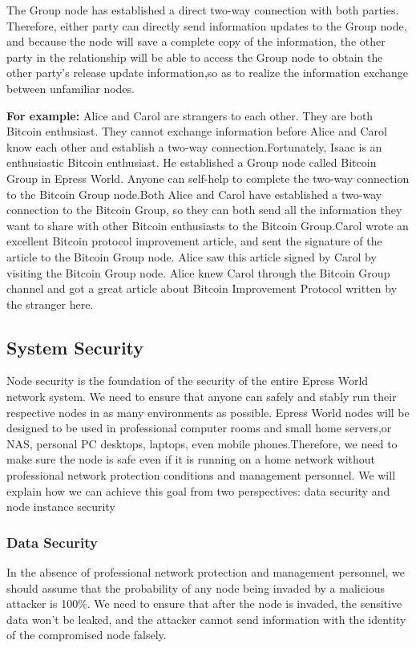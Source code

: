 \documentclass{article}
\begin{document}
    The Group node has established a direct two-way connection with both parties. Therefore, either party can directly send information updates to the Group node, and because the node will save a complete copy of the information, the other party in the relationship will be able to access the Group node to obtain the other party's release update information,so as to realize the information exchange between unfamiliar nodes.
    \newline
    \begin{blockqt}
    \textbf{For example: }Alice and Carol are strangers to each other. They are both Bitcoin enthusiast. They cannot exchange information before Alice and Carol know each other and establish a two-way connection.Fortunately, Isaac is an enthusiastic Bitcoin enthusiast. He established a Group node called Bitcoin Group in Epress World. Anyone can self-help to complete the two-way connection to the Bitcoin Group node.Both Alice and Carol have established a two-way connection to the Bitcoin Group, so they can both send all the information they want to share with other Bitcoin enthusiasts to the Bitcoin Group.Carol wrote an excellent Bitcoin protocol improvement article, and sent the signature of the article to the Bitcoin Group node. Alice saw this article signed by Carol by visiting the Bitcoin Group node. Alice knew  Carol through the Bitcoin Group channel and got a great article about Bitcoin Improvement Protocol written by the stranger here.
    \end{blockqt}
\subsection{System Security}
    Node security is the foundation of the security of the entire Epress World network system. We need to ensure that anyone can safely and stably run their respective nodes in as many environments as possible. Epress World nodes will be designed to be used in professional computer rooms and small home servers,or NAS, personal PC desktops, laptops, even mobile phones.Therefore, we need to make sure the node  is safe even if it is running on a home network without professional network protection conditions and management personnel. We will explain how we can achieve this goal from two perspectives: data security and node instance security
\subsubsection{Data Security}
    In the absence of professional network protection and management personnel, we should assume that the probability of any node being invaded by a malicious attacker is 100\%. We need to ensure that after the node is invaded, the sensitive data won't be leaked, and the attacker cannot send information with the identity of the compromised node falsely.
\end{document}
